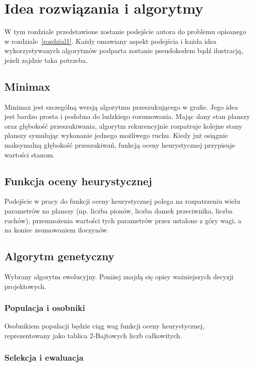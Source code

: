 \chapter{Idea rozwiązania i algorytmy}
\thispagestyle{chapterBeginStyle}
\label{rozdzial2}

{\color{dgray}
W tym rozdziale przedstawione zostanie podejście autora do problemu opisanego w rozdziale~\ref{rozdzial1}. Każdy omawiany aspekt podejścia i każda idea wykorzystywanych algorytmów podparta zostanie pseudokodem bądź ilustracją, jeżeli zajdzie taka potrzeba.
}

\section{Minimax}

Minimax jest szczególną wersją algorytmu przeszukującego w grafie. Jego idea jest bardzo prosta i podobna do ludzkiego rozumowania. Mając dany stan planszy oraz głębokość przeszukiwania, algorytm rekurencyjnie rozpatruje kolejne stany planszy symulując wykonanie jednego możliwego ruchu. Kiedy już osiągnie maksymalną głębokość przeszukiwań, funkcją oceny heurystycznej przypisuje wartości stanom.

\section{Funkcja oceny heurystycznej}

Podejście w pracy do funkcji oceny heurystycznej polega na rozpatrzeniu wielu parametrów na planszy (np. liczba pionów, liczba damek przeciwnika, liczba ruchów), przemnożenia wartości tych parametrów przez ustalone z góry wagi, a na koniec zsumowaniem iloczynów.

\section{Algorytm genetyczny}

{\color{dgray}
Wybrany algorytm ewolucyjny. Poniżej znajdą się opisy ważniejszych decyzji projektowych.
}

\subsection{Populacja i osobniki}

Osobnikiem populacji będzie ciąg wag funkcji oceny heurystycznej, reprezentowany jako tablica 2-Bajtowych liczb całkowitych.

\subsection{Selekcja i ewaluacja}

